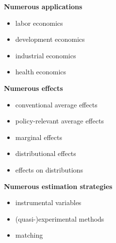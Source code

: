 \begin{frame}
\textbf{Numerous applications}\\\vspace{0.3cm}

	\begin{itemize}\setlength\itemsep{1em}
		\item labor economics
		\item development economics
		\item industrial economics
		\item health economics
	\end{itemize}
\end{frame}
\begin{frame}
\textbf{Numerous effects}\\\vspace{0.3cm}
	\begin{itemize}\setlength\itemsep{1em}
		\item conventional average effects
		\item policy-relevant average effects
		\item marginal effects
		\item distributional effects
		\item effects on distributions
	\end{itemize}
\end{frame}
\begin{frame}
\textbf{Numerous estimation strategies}\\\vspace{0.3cm}
	\begin{itemize}\setlength\itemsep{1em}
		\item instrumental variables
		\item (quasi-)experimental methods
		\item matching
	\end{itemize}
\end{frame}
